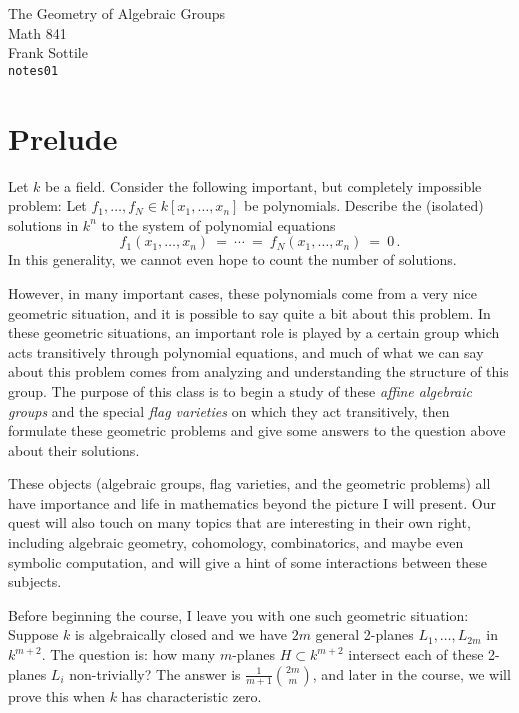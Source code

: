 \documentclass[12pt]{amsart}
\def\silentfootnote#1{{\let\thefootnote\relax\footnotetext{#1}}}
\begin{document}
\begin{center}
\Large
The Geometry of Algebraic Groups\\
\large
Math 841\\
Frank Sottile\\
{\tt notes01}
\end{center}\bigskip

\silentfootnote{\sl Version of 7 February 2000.} 

\section*{Prelude}

Let $k$ be a field.
Consider the following important, but completely impossible problem:
Let $f_1,\ldots,f_N\in k[x_1,\ldots,x_n]$ be polynomials.
Describe the (isolated) solutions in $k^n$ to the system of polynomial
equations 
$$
   f_1(x_1,\ldots,x_n)\ =\ \cdots\ =\ f_N(x_1,\ldots,x_n)\ =\ 0\,.
$$
In this generality, we cannot even hope to count the number of solutions.

However, in many important cases, these polynomials come from a very nice
geometric situation, and it is possible to say quite a bit about this
problem.
In these geometric situations, an important role is played by a
certain group which acts transitively through polynomial equations, and much
of what we can say about this problem comes from analyzing and understanding
the structure of this group.
The purpose of this class is to begin a study of these 
{\it affine algebraic groups} and the special {\it flag varieties} on
which they act transitively, then formulate these geometric problems and
give some answers to the question above about their solutions.

These objects (algebraic groups, flag varieties, and the geometric
problems) all have importance and life in mathematics beyond the picture I
will present.
Our quest will also touch on many topics that are interesting in their own
right, including algebraic geometry, cohomology, combinatorics, and maybe
even symbolic computation, and will give a hint of some interactions
between these subjects.

Before beginning the course, I leave you with one such geometric situation:
Suppose $k$ is algebraically closed and we have $2m$ general
2-planes $L_1,\ldots, L_{2m}$ in $k^{m+2}$.
The question is: how many $m$-planes $H\subset k^{m+2}$ intersect each of
these 2-planes $L_i$ non-trivially?
The answer is $\frac{1}{m+1}\binom{2m}{m}$, and later in the course, we will
prove this when $k$ has characteristic zero.
\end{document}
